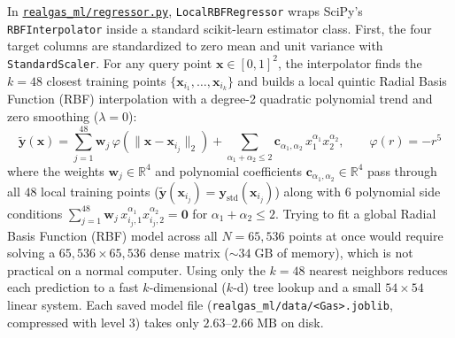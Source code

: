 \documentclass[10pt,a4paper]{article}
\begin{document}
In \href{https://github.com/satwikgupta122/realgas_ml/blob/main/realgas_ml/regressor.py}{\texttt{realgas\_ml/regressor.py}}, \texttt{LocalRBFRegressor} wraps SciPy's \texttt{RBFInterpolator} inside a standard scikit-learn estimator class. First, the four target columns are standardized to zero mean and unit variance with \texttt{StandardScaler}. For any query point $\mathbf{x} \in [0, 1]^2$, the interpolator finds the $k = 48$ closest training points $\{\mathbf{x}_{i_1},\dots,\mathbf{x}_{i_k}\}$ and builds a local quintic Radial Basis Function (RBF) interpolation with a degree-2 quadratic polynomial trend and zero smoothing ($\lambda = 0$):
\begin{equation}
\tilde{\mathbf{y}}(\mathbf{x}) = \sum_{j=1}^{48} \mathbf{w}_j\,\varphi\!\left(\|\mathbf{x} - \mathbf{x}_{i_j}\|_2\right) + \sum_{\alpha_1 + \alpha_2 \le 2} \mathbf{c}_{\alpha_1,\alpha_2}\,x_1^{\alpha_1} x_2^{\alpha_2}, \qquad \varphi(r) = -r^5
\label{eq:rbf}
\end{equation}
where the weights $\mathbf{w}_j \in \mathbb{R}^4$ and polynomial coefficients $\mathbf{c}_{\alpha_1,\alpha_2} \in \mathbb{R}^4$ pass through all $48$ local training points ($\tilde{\mathbf{y}}(\mathbf{x}_{i_j}) = \mathbf{y}_{\mathrm{std}}(\mathbf{x}_{i_j})$) along with $6$ polynomial side conditions $\sum_{j=1}^{48} \mathbf{w}_j\,x_{i_j,1}^{\alpha_1} x_{i_j,2}^{\alpha_2} = \mathbf{0}$ for $\alpha_1 + \alpha_2 \le 2$. Trying to fit a global Radial Basis Function (RBF) model across all $N = 65{,}536$ points at once would require solving a $65{,}536 \times 65{,}536$ dense matrix ($\sim 34\;\mathrm{GB}$ of memory), which is not practical on a normal computer. Using only the $k=48$ nearest neighbors reduces each prediction to a fast $k$-dimensional ($k$-d) tree lookup and a small $54 \times 54$ linear system. Each saved model file (\texttt{realgas\_ml/data/<Gas>.joblib}, compressed with level 3) takes only $2.63\text{--}2.66\;\mathrm{MB}$ on disk.
\end{document}
